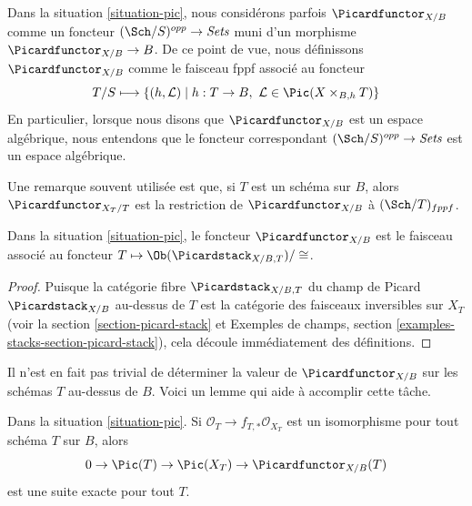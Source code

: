 \noindent
Dans la situation \ref{situation-pic}, nous considérons parfois
$\Picardfunctor_{X/B}$ comme un foncteur $(\Sch/S)^{opp} \to \textit{Sets}$
muni d'un morphisme $\Picardfunctor_{X/B} \to B$. De ce point de vue,
nous définissons $\Picardfunctor_{X/B}$ comme le faisceau fppf associé au
foncteur
$$
T/S \longmapsto \{(h, \mathcal{L}) \mid
h : T \to B,\ \mathcal{L} \in \Pic(X \times_{B, h} T)\}
$$
En particulier, lorsque nous disons que $\Picardfunctor_{X/B}$ est un espace
algébrique, nous entendons que le foncteur correspondant
$(\Sch/S)^{opp} \to \textit{Sets}$ est un espace algébrique.

\medskip\noindent
Une remarque souvent utilisée est que, si $T$ est un schéma sur $B$, alors
$\Picardfunctor_{X_T/T}$ est la restriction de $\Picardfunctor_{X/B}$ à
$(\Sch/T)_{fppf}$.

\begin{lemma}
\label{lemma-pic-over-pic}
Dans la situation \ref{situation-pic},
le foncteur $\Picardfunctor_{X/B}$ est le faisceau associé au
foncteur $T \mapsto \Ob(\Picardstack_{X/B, T})/\cong$.
\end{lemma}

\begin{proof}
Puisque la catégorie fibre $\Picardstack_{X/B, T}$ du champ de Picard
$\Picardstack_{X/B}$ au-dessus de $T$ est la catégorie des faisceaux inversibles
sur $X_T$ (voir la section \ref{section-picard-stack} et
Exemples de champs, section \ref{examples-stacks-section-picard-stack}),
cela découle immédiatement des définitions.
\end{proof}

\noindent
Il n'est en fait pas trivial de déterminer la valeur de $\Picardfunctor_{X/B}$
sur les schémas $T$ au-dessus de $B$. Voici un lemme qui aide à accomplir cette
tâche.

\begin{lemma}
\label{lemma-flat-geometrically-connected-fibres}
Dans la situation \ref{situation-pic}.
Si $\mathcal{O}_T \to f_{T, *}\mathcal{O}_{X_T}$ est un isomorphisme
pour tout schéma $T$ sur $B$, alors
$$
0 \to \Pic(T) \to \Pic(X_T) \to \Picardfunctor_{X/B}(T)
$$
est une suite exacte pour tout $T$.
\end{lemma}

